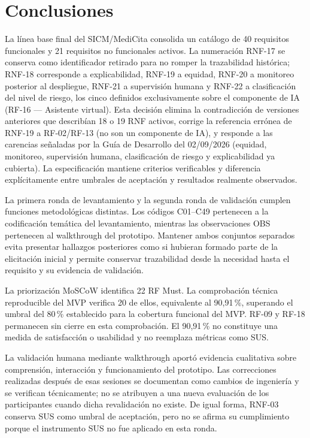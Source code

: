 \documentclass[11pt,a4paper]{article}
\begin{document}
	
	
	
	\section{Conclusiones}
	
	La línea base final del SICM/MediCita consolida un catálogo de 40 requisitos funcionales y 21 requisitos no funcionales activos. La numeración RNF-17 se conserva como identificador retirado para no romper la trazabilidad histórica; RNF-18 corresponde a explicabilidad, RNF-19 a equidad, RNF-20 a monitoreo posterior al despliegue, RNF-21 a supervisión humana y RNF-22 a clasificación del nivel de riesgo, los cinco definidos exclusivamente sobre el componente de IA (RF-16 --- Asistente virtual). Esta decisión elimina la contradicción de versiones anteriores que describían 18 o 19 RNF activos, corrige la referencia errónea de RNF-19 a RF-02/RF-13 (no son un componente de IA), y responde a las carencias señaladas por la Guía de Desarrollo del 02/09/2026 (equidad, monitoreo, supervisión humana, clasificación de riesgo y explicabilidad ya cubierta). La especificación mantiene criterios verificables y diferencia explícitamente entre umbrales de aceptación y resultados realmente observados.
	
	La primera ronda de levantamiento y la segunda ronda de validación cumplen funciones metodológicas distintas. Los códigos C01--C49 pertenecen a la codificación temática del levantamiento, mientras las observaciones OBS pertenecen al walkthrough del prototipo. Mantener ambos conjuntos separados evita presentar hallazgos posteriores como si hubieran formado parte de la elicitación inicial y permite conservar trazabilidad desde la necesidad hasta el requisito y su evidencia de validación.
	
	La priorización MoSCoW identifica 22 RF Must. La comprobación técnica reproducible del MVP verifica 20 de ellos, equivalente al 90,91\,\%, superando el umbral del 80\,\% establecido para la cobertura funcional del MVP. RF-09 y RF-18 permanecen sin cierre en esta comprobación. El 90,91\,\% no constituye una medida de satisfacción o usabilidad y no reemplaza métricas como SUS.
	
	La validación humana mediante walkthrough aportó evidencia cualitativa sobre comprensión, interacción y funcionamiento del prototipo. Las correcciones realizadas después de esas sesiones se documentan como cambios de ingeniería y se verifican técnicamente; no se atribuyen a una nueva evaluación de los participantes cuando dicha revalidación no existe. De igual forma, RNF-03 conserva SUS como umbral de aceptación, pero no se afirma su cumplimiento porque el instrumento SUS no fue aplicado en esta ronda.
	
\end{document}
